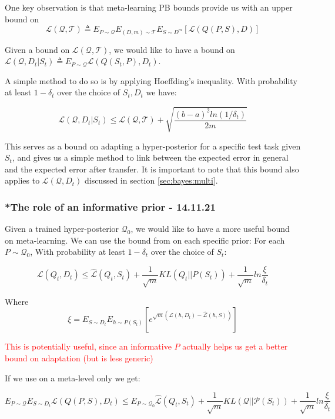 \documentclass[letterpaper]{article}
\theoremstyle{definition}
\begin{document}
One key observation is that meta-learning PB bounds provide us with an upper bound on $$\mathcal{L}(\mathcal{Q}, \mathcal{T})\triangleq E_{P\sim \mathcal{Q}}E_{(D, m)\sim \mathcal{T}}E_{S\sim D^m}\left [\mathcal{L}(Q(P, S), D)\right ]$$

Given a bound on $\mathcal{L}(\mathcal{Q}, \mathcal{T})$, we would like to have a bound on $\mathcal{L}(\mathcal{Q}, D_t|S_t)\triangleq E_{P\sim \mathcal{Q}}\mathcal{L}(Q(S_t, P), D_t)$.

A simple method to do so is by applying Hoeffding's inequality. With probability at least $1-\delta_t$ over the choice of $S_t, D_t$ we have:

\begin{equation}
\mathcal{L}(\mathcal{Q}, D_t|S_t) \leq \mathcal{L}(\mathcal{Q}, \mathcal{T}) + \sqrt{\frac{(b-a)^2 ln(1/\delta_t)}{2m}}
\end{equation}

This serves as a bound on adapting a hyper-posterior for a specific test task given $S_t$, and gives us a simple method to link between the expected error in general and the expected error after transfer. It is important to note that this bound also applies to $\mathcal{L}(\mathcal{Q}, D_t)$ discussed in section \ref{sec:bayes:multi}.

\subsubsection{*The role of an informative prior - 14.11.21}

Given a trained hyper-posterior $\mathcal{Q}_0$, we would like to have a more useful bound on meta-learning. We can use the bound from \cite{Rivasplata2020} on each specific prior:
For each $P\sim \mathcal{Q}_0$, With probability at least $1-\delta_t$ over the choice of $S_t$: 

$$\mathcal{L}(Q_t, D_t) \leq \hat{\mathcal{L}}(Q_t, S_t) + \frac{1}{\sqrt{m}}KL(Q_t|| P(S_t)) + \frac{1}{\sqrt{m}}ln\frac{\xi}{\delta_t}$$

Where $$\xi=E_{S\sim D_t}E_{h\sim P(S_t)}\left [e^{\sqrt{m}(\mathcal{L}(h, D_t)-\hat{\mathcal{L}}(h, S))} \right ]$$

\textcolor{red}{This is potentially useful, since an informative $P$ actually helps us get a better bound on adaptation (but is less generic) }

If we use \cite{Rivasplata2020} on a meta-level only we get:

 $$E_{P\sim \mathcal{Q}}E_{S\sim D_t}\mathcal{L}(Q(P, S), D_t) \leq E_{P\sim \mathcal{Q}_0}\hat{\mathcal{L}}(Q_t, S_t) + \frac{1}{\sqrt{m}}KL(\mathcal{Q}|| \mathcal{P}(S_t)) + \frac{1}{\sqrt{m}}ln\frac{\xi}{\delta_t}$$
 
\end{document}
